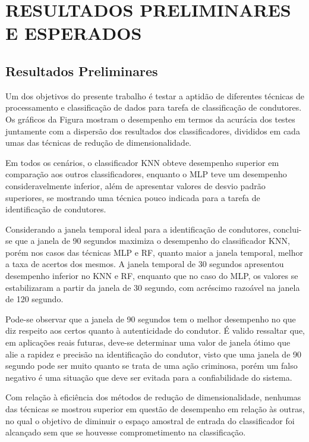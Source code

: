 \chapter{RESULTADOS PRELIMINARES E ESPERADOS}
\label{cap:resultados}

\section{Resultados Preliminares}


Um dos objetivos do presente trabalho é testar a aptidão de diferentes técnicas de processamento e classificação de dados para tarefa de classificação de condutores. Os gráficos da Figura mostram o desempenho em termos da acurácia dos testes juntamente com a dispersão dos resultados dos classificadores, divididos em cada umas das técnicas de redução de dimensionalidade.

Em todos os cenários, o classificador KNN obteve desempenho superior em comparação aos outros classificadores, enquanto o MLP teve um desempenho consideravelmente inferior, além de apresentar valores de desvio padrão superiores, se mostrando uma técnica pouco indicada para a tarefa de identificação de condutores.

Considerando a janela temporal ideal para a identificação de condutores, conclui-se que a janela de 90 segundos maximiza o desempenho do classificador KNN, porém nos casos das técnicas MLP e RF, quanto maior a janela temporal, melhor a taxa de acertos dos mesmos. A janela temporal de 30 segundos apresentou desempenho inferior no KNN e RF, enquanto que no caso do MLP, os valores se estabilizaram a partir da janela de 30 segundo, com acréscimo razoável na janela de 120 segundo. 

Pode-se observar que a janela de 90 segundos tem o melhor desempenho no que diz respeito aos certos quanto à autenticidade do condutor. É valido ressaltar que, em aplicações reais futuras, deve-se determinar uma valor de janela ótimo que alie a rapidez e precisão na identificação do condutor, visto que uma janela de 90 segundo pode ser muito quanto se trata de uma ação criminosa, porém um falso negativo é uma situação que deve ser evitada para a confiabilidade do sistema.

Com relação à eficiência dos métodos de redução de dimensionalidade, nenhumas das técnicas se mostrou superior em questão de desempenho em relação às outras, no qual o objetivo de diminuir o espaço amostral de entrada do classificador foi alcançado sem que se houvesse comprometimento na classificação.

